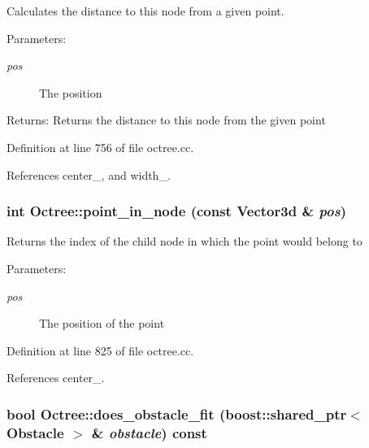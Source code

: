 Calculates the distance to this node from a given point. 

\begin{Desc}
\item[Parameters:]
\begin{description}
\item[{\em pos}]The position \end{description}
\end{Desc}
\begin{Desc}
\item[Returns:]Returns the distance to this node from the given point \end{Desc}


Definition at line 756 of file octree.cc.

References center\_\-, and width\_\-.\hypertarget{class_octree_de868d730ef2ebe1442d0cc65cfc4f39}{
\subsubsection[point\_\-in\_\-node]{\setlength{\rightskip}{0pt plus 5cm}int Octree::point\_\-in\_\-node (const Vector3d \& {\em pos})}}
\label{class_octree_de868d730ef2ebe1442d0cc65cfc4f39}


Returns the index of the child node in which the point would belong to

\begin{Desc}
\item[Parameters:]
\begin{description}
\item[{\em pos}]The position of the point \end{description}
\end{Desc}


Definition at line 825 of file octree.cc.

References center\_\-.\hypertarget{class_octree_09d72bc24be26e5814e01ee2674545b1}{
\subsubsection[does\_\-obstacle\_\-fit]{\setlength{\rightskip}{0pt plus 5cm}bool Octree::does\_\-obstacle\_\-fit (boost::shared\_\-ptr$<$ Obstacle $>$ \& {\em obstacle}) const}}
\label{class_octree_09d72bc24be26e5814e01ee2674545b1}


